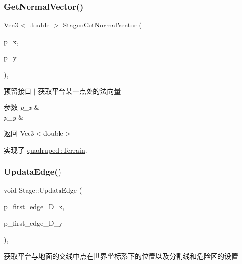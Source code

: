 \subsubsection{\texorpdfstring{Get\+Normal\+Vector()}{GetNormalVector()}}
{\footnotesize\ttfamily \hyperlink{cppTypes_8h_a65c27bf97693676535dd0b30ea0ad399}{Vec3}$<$ double $>$ Stage\+::\+Get\+Normal\+Vector (\begin{DoxyParamCaption}\item[{double}]{p\+\_\+x,  }\item[{double}]{p\+\_\+y }\end{DoxyParamCaption})\hspace{0.3cm}{\ttfamily [override]}, {\ttfamily [virtual]}}



预留接口 $\vert$ 获取平台某一点处的法向量 


\begin{DoxyParams}{参数}
{\em p\+\_\+x} & \\
\hline
{\em p\+\_\+y} & \\
\hline
\end{DoxyParams}
\begin{DoxyReturn}{返回}
Vec3$<$double$>$ 
\end{DoxyReturn}


实现了 \hyperlink{classquadruped_1_1Terrain}{quadruped\+::\+Terrain}.

\mbox{\label{classquadruped_1_1Stage_ad4e6f5c9b83346f867d0b1eb470342f3}} 
\subsubsection{\texorpdfstring{Updata\+Edge()}{UpdataEdge()}}
{\footnotesize\ttfamily void Stage\+::\+Updata\+Edge (\begin{DoxyParamCaption}\item[{double}]{p\+\_\+first\+\_\+edge\+\_\+\+D\+\_\+x,  }\item[{double}]{p\+\_\+first\+\_\+edge\+\_\+\+D\+\_\+y }\end{DoxyParamCaption})\hspace{0.3cm}{\ttfamily [override]}, {\ttfamily [virtual]}}



获取平台与地面的交线中点在世界坐标系下的位置以及分割线和危险区的设置 



